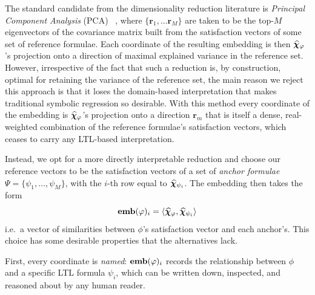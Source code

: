 \documentclass[titlepage,a4paper,11pt]{report}
\begin{document}
    The standard candidate from the dimensionality reduction literature is \textit{Principal Component Analysis} (PCA) ~\citep{van_der_maaten_dimensionality_2007, hasan_review_2021}, where $\{\bm r_1, \dots \bm r_M \}$ are taken to be the top-$M$ eigenvectors of the covariance matrix built from the satisfaction vectors of some set of reference formulae. Each coordinate of the resulting embedding is then $\bm{\widehat\chi}_\varphi$'s projection onto a direction of maximal explained variance in the reference set. However, irrespective of the fact that such a reduction is, by construction, optimal for retaining the variance of the reference set, the main reason we reject this approach is that it loses the domain-based interpretation that makes traditional symbolic regression so desirable. With this method every coordinate of the embedding is $\bm{\widehat\chi}_\varphi$'s projection onto a direction $\bm r_m$ that is itself a dense, real-weighted combination of the reference formulae's satisfaction vectors, which ceases to carry any LTL-based interpretation.

    Instead, we opt for a more directly interpretable reduction and choose our reference vectors to be the satisfaction vectors of a set of \emph{anchor formulae} $\Psi = \{\psi_1, \dots, \psi_M\}$, with the $i$-th row equal to $\bm{\widehat\chi}_{\psi_i}$. The embedding then takes the form 
    \begin{equation}
        \textbf{emb}(\varphi)_i = \langle\bm{\widehat\chi}_\varphi, \bm{\widehat\chi}_{\psi_i}\rangle
    \end{equation}
    i.e.\ a vector of similarities between $\phi$'s satisfaction vector and each anchor's. This choice has some desirable properties that the alternatives lack. 
    
    First, every coordinate is \emph{named}: $\textbf{emb}(\varphi)_i$ records the relationship between $\phi$ and a specific LTL formula $\psi_i$, which can be written down, inspected, and reasoned about by any human reader. 
    
\end{document}
